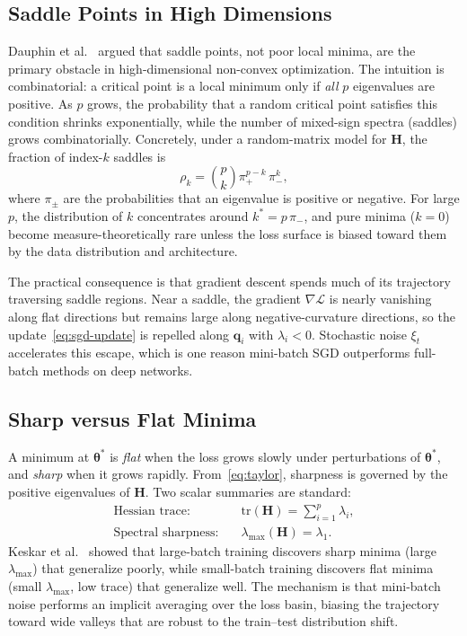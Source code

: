 \documentclass[twocolumn,10pt]{article}
\newcommand{\Hmat}{\mathbf{H}}
\newcommand{\grad}{\nabla}
\begin{document}
\subsection{Saddle Points in High Dimensions}

Dauphin et al.~\cite{dauphin2014identifying} argued that saddle points, not poor local minima, are the primary obstacle in high-dimensional non-convex optimization. The intuition is combinatorial: a critical point is a local minimum only if \emph{all} $p$ eigenvalues are positive. As $p$ grows, the probability that a random critical point satisfies this condition shrinks exponentially, while the number of mixed-sign spectra (saddles) grows combinatorially. Concretely, under a random-matrix model for $\Hmat$, the fraction of index-$k$ saddles is
\begin{equation}
\rho_k = \binom{p}{k} \pi_+^{p-k}\,\pi_-^{k},
\label{eq:saddle-fraction}
\end{equation}
where $\pi_\pm$ are the probabilities that an eigenvalue is positive or negative. For large $p$, the distribution of $k$ concentrates around $k^\ast = p\,\pi_-$, and pure minima ($k=0$) become measure-theoretically rare unless the loss surface is biased toward them by the data distribution and architecture.

The practical consequence is that gradient descent spends much of its trajectory traversing saddle regions. Near a saddle, the gradient $\grad \mathcal{L}$ is nearly vanishing along flat directions but remains large along negative-curvature directions, so the update~\eqref{eq:sgd-update} is repelled along $\mathbf{q}_i$ with $\lambda_i < 0$. Stochastic noise $\xi_t$ accelerates this escape, which is one reason mini-batch SGD outperforms full-batch methods on deep networks.

\subsection{Sharp versus Flat Minima}

A minimum at $\boldsymbol{\theta}^\ast$ is \emph{flat} when the loss grows slowly under perturbations of $\boldsymbol{\theta}^\ast$, and \emph{sharp} when it grows rapidly. From~\eqref{eq:taylor}, sharpness is governed by the positive eigenvalues of $\Hmat$. Two scalar summaries are standard:
\begin{align}
\text{Hessian trace:} \quad & \mathrm{tr}(\Hmat) = \sum_{i=1}^{p} \lambda_i, \label{eq:trace} \\
\text{Spectral sharpness:} \quad & \lambda_{\max}(\Hmat) = \lambda_1. \label{eq:lmax}
\end{align}
Keskar et al.~\cite{keskar2017large} showed that large-batch training discovers sharp minima (large $\lambda_{\max}$) that generalize poorly, while small-batch training discovers flat minima (small $\lambda_{\max}$, low trace) that generalize well. The mechanism is that mini-batch noise performs an implicit averaging over the loss basin, biasing the trajectory toward wide valleys that are robust to the train--test distribution shift.
\end{document}
